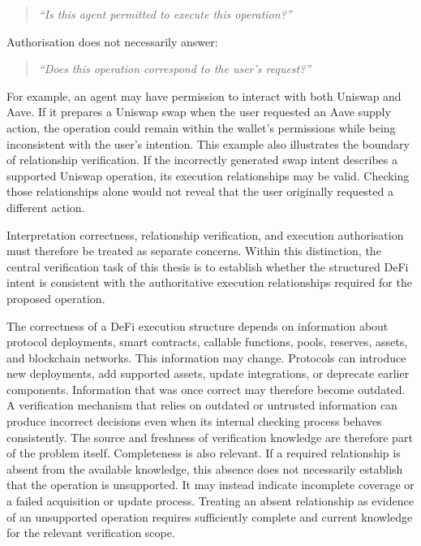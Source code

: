 \begin{quote}
\textit{``Is this agent permitted to execute this operation?''}
\end{quote}

Authorisation does not necessarily answer:

\begin{quote}
\textit{``Does this operation correspond to the user's request?''}
\end{quote}

For example, an agent may have permission to interact with both Uniswap
and Aave. If it prepares a Uniswap swap when the user requested an Aave
supply action, the operation could remain within the wallet's
permissions while being inconsistent with the user's intention. This example also illustrates the boundary of relationship
verification. If the incorrectly generated swap intent describes a
supported Uniswap operation, its execution relationships may be valid.
Checking those relationships alone would not reveal that the user
originally requested a different action.

Interpretation correctness, relationship verification, and execution
authorisation must therefore be treated as separate concerns. Within
this distinction, the central verification task of this thesis is to
establish whether the structured DeFi intent is consistent with the
authoritative execution relationships required for the proposed
operation.


The correctness of a DeFi execution structure depends on information
about protocol deployments, smart contracts, callable functions, pools,
reserves, assets, and blockchain networks. This information may change.
Protocols can introduce new deployments, add supported assets, update
integrations, or deprecate earlier components. Information that was
once correct may therefore become outdated. A verification mechanism that relies on outdated or untrusted
information can produce incorrect decisions even when its internal
checking process behaves consistently. The source and freshness of
verification knowledge are therefore part of the problem itself. Completeness is also relevant. If a required relationship is absent
from the available knowledge, this absence does not necessarily
establish that the operation is unsupported. It may instead indicate
incomplete coverage or a failed acquisition or update process.
Treating an absent relationship as evidence of an unsupported operation
requires sufficiently complete and current knowledge for the relevant
verification scope.


